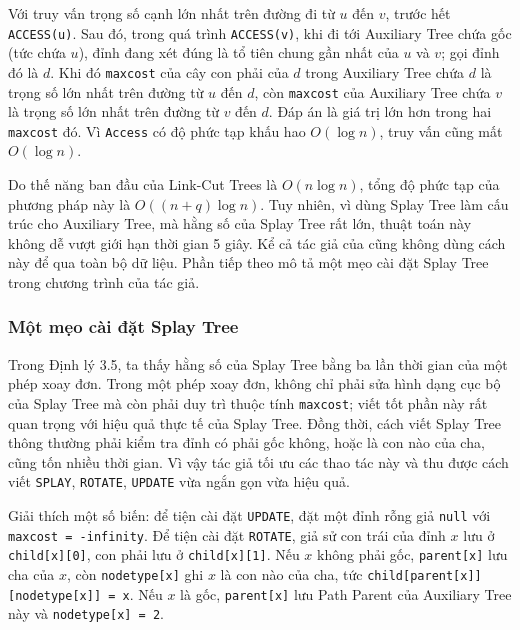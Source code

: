 \documentclass[11pt]{article}
\begin{document}
Với truy vấn trọng số cạnh lớn nhất trên đường đi từ $u$ đến $v$, trước hết
\texttt{ACCESS(u)}. Sau đó, trong quá trình \texttt{ACCESS(v)}, khi đi tới
Auxiliary Tree chứa gốc (tức chứa $u$), đỉnh đang xét đúng là tổ tiên chung gần
nhất của $u$ và $v$; gọi đỉnh đó là $d$. Khi đó \texttt{maxcost} của cây con
phải của $d$ trong Auxiliary Tree chứa $d$ là trọng số lớn nhất trên đường từ
$u$ đến $d$, còn \texttt{maxcost} của Auxiliary Tree chứa $v$ là trọng số lớn
nhất trên đường từ $v$ đến $d$. Đáp án là giá trị lớn hơn trong hai
\texttt{maxcost} đó. Vì \texttt{Access} có độ phức tạp khấu hao $O(\log n)$,
truy vấn cũng mất $O(\log n)$.

Do thế năng ban đầu của Link-Cut Trees là $O(n\log n)$, tổng độ phức tạp của
phương pháp này là $O((n+q)\log n)$. Tuy nhiên, vì dùng Splay Tree làm cấu trúc
cho Auxiliary Tree, mà hằng số của Splay Tree rất lớn, thuật toán này không dễ
vượt giới hạn thời gian 5 giây. Kể cả tác giả của \cite{zhou} cũng không dùng
cách này để qua toàn bộ dữ liệu. Phần tiếp theo mô tả một mẹo cài đặt Splay
Tree trong chương trình của tác giả.

\subsubsection{Một mẹo cài đặt Splay Tree}

Trong Định lý 3.5, ta thấy hằng số của Splay Tree bằng ba lần thời gian của
một phép xoay đơn. Trong một phép xoay đơn, không chỉ phải sửa hình dạng cục bộ
của Splay Tree mà còn phải duy trì thuộc tính \texttt{maxcost}; viết tốt phần
này rất quan trọng với hiệu quả thực tế của Splay Tree. Đồng thời, cách viết
Splay Tree thông thường phải kiểm tra đỉnh có phải gốc không, hoặc là con nào
của cha, cũng tốn nhiều thời gian. Vì vậy tác giả tối ưu các thao tác này và
thu được cách viết \texttt{SPLAY}, \texttt{ROTATE}, \texttt{UPDATE} vừa ngắn
gọn vừa hiệu quả.

Giải thích một số biến: để tiện cài đặt \texttt{UPDATE}, đặt một đỉnh rỗng giả
\texttt{null} với \texttt{maxcost = -infinity}. Để tiện cài đặt
\texttt{ROTATE}, giả sử con trái của đỉnh $x$ lưu ở \texttt{child[x][0]}, con
phải lưu ở \texttt{child[x][1]}. Nếu $x$ không phải gốc, \texttt{parent[x]} lưu
cha của $x$, còn \texttt{nodetype[x]} ghi $x$ là con nào của cha, tức
\texttt{child[parent[x]][nodetype[x]] = x}. Nếu $x$ là gốc, \texttt{parent[x]}
lưu Path Parent của Auxiliary Tree này và \texttt{nodetype[x] = 2}.
\end{document}

